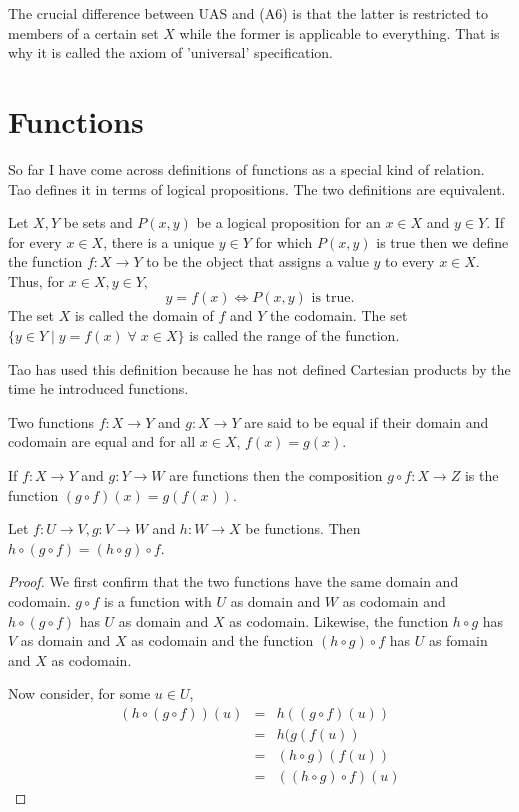 The crucial difference between UAS and (A6) is that the latter is 
restricted to members of a certain set $X$ while the former is applicable 
to everything. That is why it is called the axiom of 'universal' 
specification.

\section{Functions}\label{c2s3}
So far I have come across definitions of functions as a special kind of
relation. Tao \cite{tao2014a1} defines it in terms of logical propositions.
The two definitions are equivalent.
\begin{defn}\label{c2s3d1}
Let $X, Y$ be sets and $P(x, y)$ be a logical proposition for an $x \in X$
and $y \in Y$. If for every $x \in X$, there is a unique $y \in Y$ for 
which $P(x, y)$ is true then we define the function $f: X \rightarrow Y$ to 
be the object that assigns a value $y$ to every $x \in X$. Thus, for $x 
\in X, y \in Y$,
\[
y = f(x) \Leftrightarrow P(x, y) \text{ is true.}
\]
The set $X$ is called the domain of $f$ and $Y$ the codomain. The set $\{y
\in Y \;|\; y = f(x) \;\forall\; x \in X\}$ is called the range of the 
function.
\end{defn}

Tao has used this definition because he has not defined Cartesian products
by the time he introduced functions.

\begin{defn}\label{c2s3d2}
Two functions $f: X \rightarrow Y$ and $g: X \rightarrow Y$ are said to be
equal if their domain and codomain are equal and for all $x \in X$, $f(x) = 
g(x)$.
\end{defn}

\begin{defn}\label{c2s3d3}
If $f: X \rightarrow Y$ and $g: Y \rightarrow W$ are functions then the
composition $g \circ f: X \rightarrow Z$ is the function $(g \circ f)(x)
= g(f(x))$.
\end{defn}

\begin{lem}\label{c2s3p1}
Let $f: U \rightarrow V, g: V \rightarrow W$ and $h: W \rightarrow X$ be
functions. Then $h \circ (g \circ f) = (h \circ g) \circ f$.
\end{lem}
\begin{proof}
We first confirm that the two functions have the same domain and codomain. 
$g \circ f$ is a function with $U$ as domain and $W$ as codomain and $h 
\circ (g \circ f)$ has $U$ as domain and $X$ as codomain. Likewise, the 
function $h \circ g$ has $V$ as domain and $X$ as codomain and the function
$(h \circ g) \circ f$ has $U$ as fomain and $X$ as codomain. 

Now consider, for some $u \in U$,
\begin{eqnarray*}
(h \circ (g \circ f))(u) &=& h((g \circ f)(u)) \\
 &=& h(g(f(u)) \\
 &=& (h \circ g)(f(u)) \\
 &=& ((h \circ g) \circ f)(u)
\end{eqnarray*}
\end{proof}

